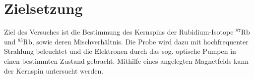 \section{Zielsetzung}
\label{sec:Zielsetzung}
Ziel des Versuches ist die Bestimmung des Kernspins der Rubidium-Isotope $^{87}\text{Rb}$ und $^{85}\text{Rb}$, sowie deren Mischverhältnis.
Die Probe wird dazu mit hochfrequenter Strahlung beleuchtet und die Elektronen durch das sog. optische Pumpen in einen bestimmten Zustand gebracht.
Mithilfe eines angelegten Magnetfelds kann der Kernspin untersucht werden.